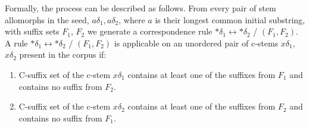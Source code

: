\documentclass[11pt]{article}
\begin{document}
%
%
\noindent
Formally, the process can be described as follows.
From every pair of stem allomorphs in the seed, $a\delta_1, a\delta_2$, where $a$ is their longest common initial substring,
with suffix
sets $F_1$, $F_2$ we generate a correspondence rule $*\delta_1 \leftrightarrow *\delta_2$ / $(F_1, F_2)$. A rule $*\delta_1 \leftrightarrow *\delta_2$ / $(F_1, F_2)$ is applicable on an unordered pair of c-stems {$x\delta_1$, $x\delta_2$} present in the corpus if:

\begin{enumerate}
\item C-suffix set of the c-stem $x\delta_1$ contains at least one of the suffixes from $F_1$ and contains no suffix from $F_2$.
\item C-suffix set of the c-stem $x\delta_2$ contains at least one of the suffixes from $F_2$ and contains no suffix from $F_1$.
\end{enumerate}
\end{document}
